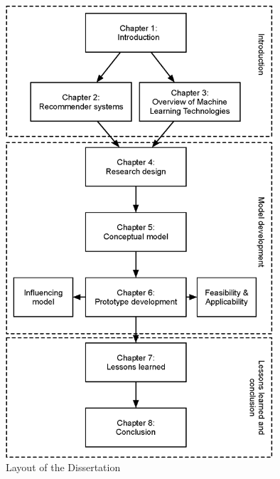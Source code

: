 \begin{figure}[htbp]
\centering
\includegraphics[width=10cm]{./figures/overlast.eps}
\caption{Layout of the Dissertation}
\label{fig:Dlayout}
\end{figure}
